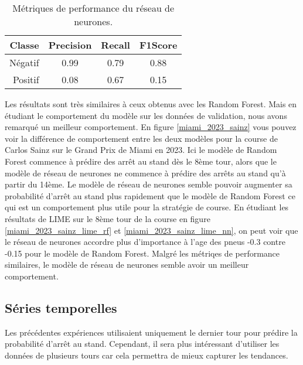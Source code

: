 \begin{table}[H]
    \begin{center}
        \caption{\label{neural_network_results}Métriques de performance du réseau de neurones.}
        \begin{tabular}{r|ccc}
            Classe  & Precision & Recall & F1Score \\ \hline
            Négatif & 0.99      & 0.79   & 0.88    \\
            Positif & 0.08      & 0.67   & 0.15    \\
        \end{tabular}
    \end{center}
\end{table}
Les résultats sont très similaires à ceux obtenus avec les Random Forest. Mais en étudiant le comportement du modèle sur les données de validation,
nous avons remarqué un meilleur comportement. En figure \ref{miami_2023_sainz} vous pouvez voir la différence de comportement entre les deux modèles pour la course de Carlos Sainz sur le Grand Prix de Miami en 2023.
Ici le modèle de Random Forest commence à prédire des arrêt au stand dès le 8ème tour, alors que le modèle de réseau de neurones ne commence à prédire des arrêts au stand qu'à partir du 14ème.
Le modèle de réseau de neurones semble pouvoir augmenter sa probabilité d'arrêt au stand plus rapidement que le modèle de Random Forest ce qui est un comportement plus utile pour la stratégie de course.
En étudiant les résultats de LIME sur le 8ème tour de la course en figure \ref{miami_2023_sainz_lime_rf} et \ref{miami_2023_sainz_lime_nn},
on peut voir que le réseau de neurones accordre plus d'importance à l'age des pneus -0.3 contre -0.15 pour le modèle de Random Forest.
Malgré les métriqes de performance similaires, le modèle de réseau de neurones semble avoir un meilleur comportement.

\subsection{Séries temporelles}
Les précédentes expériences utilisaient uniquement le dernier tour pour prédire la probabilité d'arrêt au stand.
Cependant, il sera plus intéressant d'utiliser les données de plusieurs tours car cela permettra de mieux capturer les tendances.

